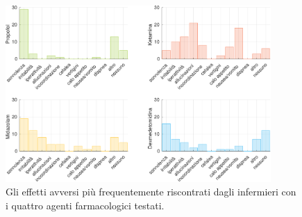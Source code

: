 \begin{figure}[!h]
    \centering
    \includegraphics[width=0.9\textwidth]{Figure/effetti-avversi.pdf}
    \caption{Gli effetti avversi più frequentemente riscontrati dagli infermieri con i quattro agenti farmacologici testati.}
    \label{fig:sicurezza}
\end{figure}


